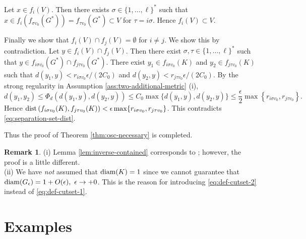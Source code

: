 \documentclass[a4paper, reqno, 11pt]{amsart}
\theoremstyle{definition}
\newtheorem{Rem}[Thm]{Remark}
\begin{document}
Let $x \in f_i (V)$. 
Then there exists $\sigma  \in \{1, \dots, \ell\}^{*}$ such that $x \in f_i (f_{\sigma v_0}(G^{*})) = f_{\tau v_0}(G^{*}) \subset V$ for $\tau = i \sigma$. 
Hence $f_i (V) \subset V$. 

Finally we show that $f_i (V) \cap f_j (V) = \emptyset$ for $i \ne j$. 
We show this by contradiction. 
Let $y \in f_i (V) \cap f_j (V)$. 
Then there exist $\sigma, \tau \in \{1, \dots, \ell\}^{*}$ such that $y \in f_{i \sigma v_0} (G^*) \cap f_{j \tau v_0} (G^*)$. 
There exist $y_1 \in f_{i \sigma v_0}(K)$ and $y_2 \in f_{j \tau v_0}(K)$ such that $d(y_1, y) < r_{i \sigma v_0} \epsilon /(2 C_0)$ and $d(y_2, y) < r_{j \tau v_0} \epsilon /(2 C_0)$. 
By the strong regularity in Assumption \ref{ass:two-additional-metric} (i), 
\[ d(y_1, y_2) \le \Phi_d (d(y_1, y), d(y_2, y)) \le C_0 \max\{d(y_1, y), d(y_2, y)\} \le \frac{\epsilon}{2} \max\left\{r_{i \sigma v_0}, r_{j \tau v_0} \right\}. \]
Hence $\textup{dist}\left(f_{i \sigma v_0}(K),  f_{j \tau v_0}(K)\right) < \epsilon \max\{r_{i \sigma v_0}, r_{j \tau v_0} \}$. 
This contradicts \eqref{eq:separation-set-dist}. 

Thus the proof of Theorem \ref{thm:osc-necessary} is completed. 

\begin{Rem}
(i) Lemma \ref{lem:inverse-contained} corresponds to \cite[(9.6.3)]{BishopPeres2017}; however, the proof is a little different. \\
(ii) We have {\it not} assumed that $\textup{diam}(K) = 1$ since we cannot guarantee that $\textup{diam}(G_{\epsilon}) = 1+ O(\epsilon), \ \epsilon \to +0$. 
This is the reason for introducing \eqref{eq:def-cutset-2} instead of \eqref{eq:def-cutset-1}. 
\end{Rem}

\section{Examples}\label{sec:exa}
\end{document}
